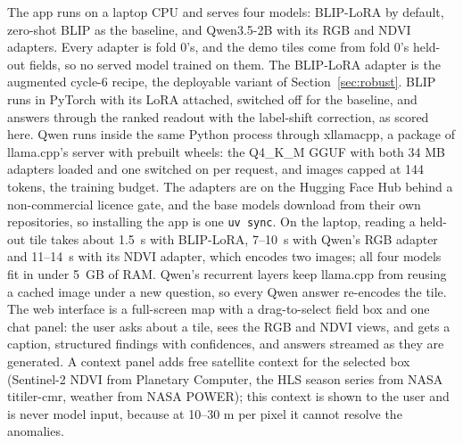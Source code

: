 \documentclass[10pt,twocolumn]{article}
\begin{document}
The app runs on a laptop CPU and serves four models: BLIP-LoRA by default, zero-shot BLIP as the baseline, and Qwen3.5-2B with its RGB and NDVI adapters. Every adapter is fold 0's, and the demo tiles come from fold 0's held-out fields, so no served model trained on them. The BLIP-LoRA adapter is the augmented cycle-6 recipe, the deployable variant of Section~\ref{sec:robust}. BLIP runs in PyTorch with its LoRA attached, switched off for the baseline, and answers through the ranked readout with the label-shift correction, as scored here. Qwen runs inside the same Python process through xllamacpp, a package of llama.cpp's server with prebuilt wheels: the Q4\_K\_M GGUF with both 34 MB adapters loaded and one switched on per request, and images capped at 144 tokens, the training budget. The adapters are on the Hugging Face Hub behind a non-commercial licence gate, and the base models download from their own repositories, so installing the app is one \texttt{uv sync}. On the laptop, reading a held-out tile takes about 1.5~s with BLIP-LoRA, 7--10~s with Qwen's RGB adapter and 11--14~s with its NDVI adapter, which encodes two images; all four models fit in under 5~GB of RAM. Qwen's recurrent layers keep llama.cpp from reusing a cached image under a new question, so every Qwen answer re-encodes the tile. The web interface is a full-screen map with a drag-to-select field box and one chat panel: the user asks about a tile, sees the RGB and NDVI views, and gets a caption, structured findings with confidences, and answers streamed as they are generated. A context panel adds free satellite context for the selected box (Sentinel-2 NDVI from Planetary Computer, the HLS season series from NASA titiler-cmr, weather from NASA POWER); this context is shown to the user and is never model input, because at 10--30 m per pixel it cannot resolve the anomalies.
\end{document}
